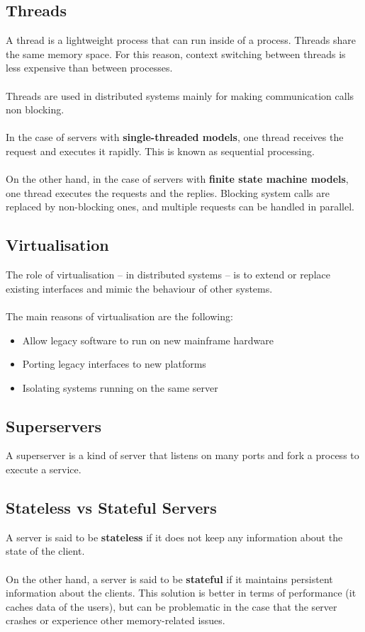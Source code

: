 \documentclass{article}
\begin{document}
\subsection{Threads}
A thread is a lightweight process that can run inside of a process. Threads share the same memory space. For this reason, context switching between threads is less expensive than between processes. \\ \\
Threads are used in distributed systems mainly for making communication calls non blocking. \\ \\
In the case of servers with \textbf{single-threaded models}, one thread receives the request and executes it rapidly. This is known as sequential processing. \\ \\
On the other hand, in the case of servers with \textbf{finite state machine models}, one thread executes the requests and the replies. Blocking system calls are replaced by non-blocking ones, and multiple requests can be handled in parallel.

\subsection{Virtualisation}
The role of virtualisation -- in distributed systems -- is to extend or replace existing interfaces and mimic the behaviour of other systems. \\ \\
The main reasons of virtualisation are the following:

\begin{itemize}
	\item Allow legacy software to run on new mainframe hardware
	\item Porting legacy interfaces to new platforms
	\item Isolating systems running on the same server
\end{itemize}

\subsection{Superservers}
A superserver is a kind of server that listens on many ports and fork a process to execute a service.

\subsection{Stateless vs Stateful Servers}
A server is said to be \textbf{stateless} if it does not keep any information about the state of the client. \\ \\
On the other hand, a server is said to be \textbf{stateful} if it maintains persistent information about the clients. This solution is better in terms of performance (it caches data of the users), but can be problematic in the case that the server crashes or experience other memory-related issues.
\end{document}
